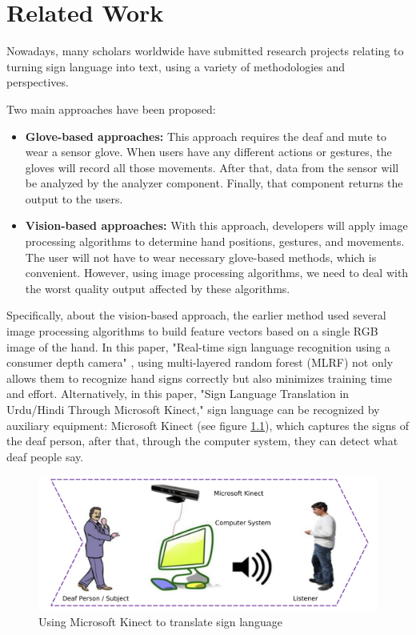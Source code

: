 \chapter{Related Work}

Nowadays, many scholars worldwide have submitted research projects relating to turning sign language into text, using a variety of methodologies and perspectives.

Two main approaches have been proposed:
\begin{itemize}
  \item \textbf{Glove-based approaches:} This approach requires the deaf and mute to wear a sensor glove. When users have any different actions or gestures, the gloves will record all those movements. After that, data from the sensor will be analyzed by the analyzer component. Finally, that component returns the output to the users.
  \item \textbf{Vision-based approaches:} With this approach, developers will apply image processing algorithms to determine hand positions, gestures, and movements. The user will not have to wear necessary glove-based methods, which is convenient. However, using image processing algorithms, we need to deal with the worst quality output affected by these algorithms.
\end{itemize}

Specifically, about the vision-based approach, the earlier method used several image processing algorithms to build feature vectors based on a single RGB image of the hand. In this paper, "Real-time sign language recognition using a consumer depth camera" \cite{kuznetsova2013real}, using multi-layered random forest (MLRF) not only allows them to recognize hand signs correctly but also minimizes training time and effort. Alternatively, in this paper, "Sign Language Translation in Urdu/Hindi Through Microsoft Kinect," sign language can be recognized by auxiliary equipment: Microsoft Kinect (see figure \ref{fig:Chap2-MS-Kinect}), which captures the signs of the deaf person, after that, through the computer system, they can detect what deaf people say.

\begin{figure}[H]
  \centering
  \includegraphics[width=\textwidth]{img/Chap2/MS-Kinect.png}
  \caption{Using Microsoft Kinect to translate sign language}
  \label{fig:Chap2-MS-Kinect}
\end{figure}

